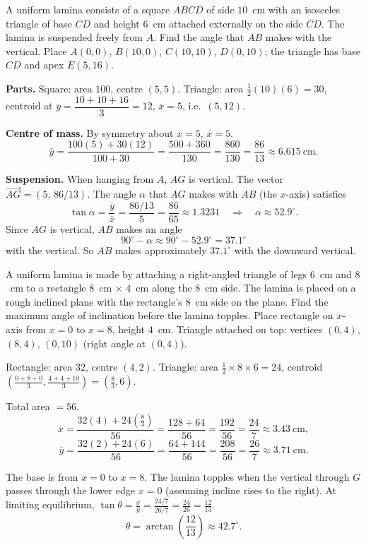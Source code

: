 \documentclass[11pt]{article}
\begin{document}
\begin{exoresolu}
A uniform lamina consists of a square $ABCD$ of side $10$~cm with an isosceles triangle of base $CD$ and height $6$~cm attached externally on the side $CD$. The lamina is suspended freely from $A$. Find the angle that $AB$ makes with the vertical.
\tcblower
Place $A(0,0)$, $B(10,0)$, $C(10,10)$, $D(0,10)$; the triangle has base $CD$ and apex $E(5,16)$.

\textbf{Parts.}
Square: area $100$, centre $(5,5)$.
Triangle: area $\tfrac12(10)(6)=30$, centroid at $\bar y=\dfrac{10+10+16}{3}=12$, $\bar x=5$, i.e.\ $(5,12)$.

\textbf{Centre of mass.} By symmetry about $x=5$, $\bar{x}=5$.
\[
\bar{y}=\frac{100(5)+30(12)}{100+30}=\frac{500+360}{130}=\frac{860}{130}=\frac{86}{13}\approx 6.615\ \text{cm}.
\]

\textbf{Suspension.} When hanging from $A$, $AG$ is vertical. The vector $\vec{AG}=(5,\,86/13)$. The angle $\alpha$ that $AG$ makes with $AB$ (the $x$-axis) satisfies
\[
\tan\alpha=\frac{\bar y}{\bar x}=\frac{86/13}{5}=\frac{86}{65}\approx 1.3231\quad\Rightarrow\quad \alpha\approx 52.9^{\circ}.
\]
Since $AG$ is vertical, $AB$ makes an angle
\[
90^{\circ}-\alpha\approx 90^{\circ}-52.9^{\circ}=37.1^{\circ}
\]
with the vertical. So $AB$ makes approximately $37.1^{\circ}$ with the downward vertical.
\end{exoresolu}

\begin{exoresolu}
A uniform lamina is made by attaching a right-angled triangle of legs $6$~cm and $8$~cm to a rectangle $8$~cm $\times$ $4$~cm along the $8$~cm side. The lamina is placed on a rough inclined plane with the rectangle's $8$~cm side on the plane. Find the maximum angle of inclination before the lamina topples.
\tcblower
Place rectangle on $x$-axis from $x=0$ to $x=8$, height $4$~cm. Triangle attached on top: vertices $(0,4)$, $(8,4)$, $(0,10)$ (right angle at $(0,4)$).

Rectangle: area $32$, centre $(4,2)$.
Triangle: area $\frac12\times 8\times 6=24$, centroid $\left(\frac{0+8+0}{3},\frac{4+4+10}{3}\right)=\left(\frac{8}{3},6\right)$.

Total area $=56$.
\[
\bar{x}=\frac{32(4)+24(\frac{8}{3})}{56}=\frac{128+64}{56}=\frac{192}{56}=\frac{24}{7}\approx 3.43\ \text{cm},
\]
\[
\bar{y}=\frac{32(2)+24(6)}{56}=\frac{64+144}{56}=\frac{208}{56}=\frac{26}{7}\approx 3.71\ \text{cm}.
\]

The base is from $x=0$ to $x=8$. The lamina topples when the vertical through $G$ passes through the lower edge $x=0$ (assuming incline rises to the right). At limiting equilibrium, $\tan\theta = \frac{\bar{x}}{\bar{y}} = \frac{24/7}{26/7} = \frac{24}{26} = \frac{12}{13}$.
\[
\theta = \arctan\left(\frac{12}{13}\right) \approx 42.7^{\circ}.
\]
\end{exoresolu}
\end{document}
